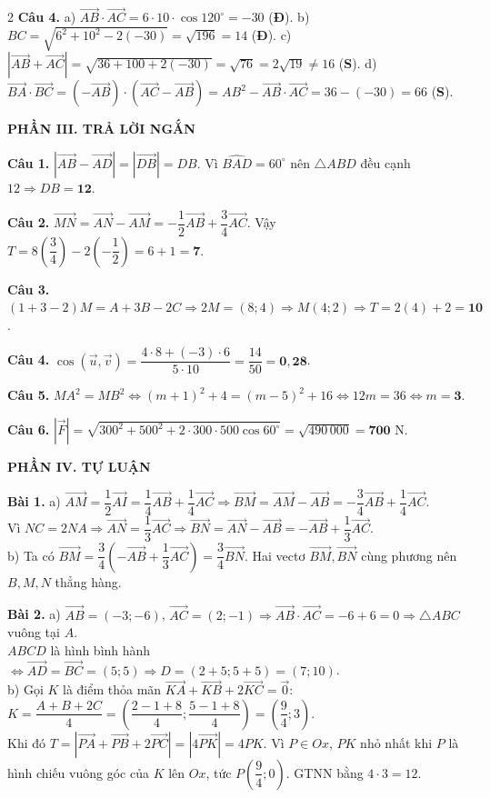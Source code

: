 \documentclass[10pt,a4paper]{article}
\begin{document}
\begin{multicols}{2}
\textbf{Câu 4.}
a) $\vec{AB}\cdot\vec{AC} = 6\cdot 10\cdot\cos 120^\circ = -30$ (\textbf{Đ}).
b) $BC = \sqrt{6^2 + 10^2 - 2(-30)} = \sqrt{196} = 14$ (\textbf{Đ}).
c) $|\vec{AB} + \vec{AC}| = \sqrt{36 + 100 + 2(-30)} = \sqrt{76} = 2\sqrt{19} \neq 16$ (\textbf{S}).
d) $\vec{BA}\cdot\vec{BC} = (-\vec{AB})\cdot(\vec{AC} - \vec{AB}) = AB^2 - \vec{AB}\cdot\vec{AC} = 36 - (-30) = 66$ (\textbf{S}).

\textbf{\color{brandDark}\textsf{PHẦN III. TRẢ LỜI NGẮN}}

\textbf{Câu 1.} $|\vec{AB} - \vec{AD}| = |\vec{DB}| = DB$. Vì $\widehat{BAD} = 60^\circ$ nên $\triangle ABD$ đều cạnh $12 \Rightarrow DB = \mathbf{12}$.

\textbf{Câu 2.} $\vec{MN} = \vec{AN} - \vec{AM} = -\dfrac{1}{2}\vec{AB} + \dfrac{3}{4}\vec{AC}$. Vậy $T = 8\left(\dfrac{3}{4}\right) - 2\left(-\dfrac{1}{2}\right) = 6 + 1 = \mathbf{7}$.

\textbf{Câu 3.} $(1 + 3 - 2)M = A + 3B - 2C \Rightarrow 2M = (8; 4) \Rightarrow M(4; 2) \Rightarrow T = 2(4) + 2 = \mathbf{10}$.

\textbf{Câu 4.} $\cos(\vec{u}, \vec{v}) = \dfrac{4\cdot 8 + (-3)\cdot 6}{5\cdot 10} = \dfrac{14}{50} = \mathbf{0{,}28}$.

\textbf{Câu 5.} $MA^2 = MB^2 \Leftrightarrow (m + 1)^2 + 4 = (m - 5)^2 + 16 \Leftrightarrow 12m = 36 \Leftrightarrow m = \mathbf{3}$.

\textbf{Câu 6.} $|\vec{F}| = \sqrt{300^2 + 500^2 + 2\cdot 300\cdot 500\cos 60^\circ} = \sqrt{490\,000} = \mathbf{700}\text{ N}$.

\textbf{\color{brandDark}\textsf{PHẦN IV. TỰ LUẬN}}

\textbf{Bài 1.}
a) $\vec{AM} = \dfrac{1}{2}\vec{AI} = \dfrac{1}{4}\vec{AB} + \dfrac{1}{4}\vec{AC} \Rightarrow \vec{BM} = \vec{AM} - \vec{AB} = -\dfrac{3}{4}\vec{AB} + \dfrac{1}{4}\vec{AC}$.\\
Vì $NC = 2NA \Rightarrow \vec{AN} = \dfrac{1}{3}\vec{AC} \Rightarrow \vec{BN} = \vec{AN} - \vec{AB} = -\vec{AB} + \dfrac{1}{3}\vec{AC}$.\\
b) Ta có $\vec{BM} = \dfrac{3}{4}\left(-\vec{AB} + \dfrac{1}{3}\vec{AC}\right) = \dfrac{3}{4}\vec{BN}$. Hai vectơ $\vec{BM}, \vec{BN}$ cùng phương nên $B, M, N$ thẳng hàng.

\textbf{Bài 2.}
a) $\vec{AB} = (-3; -6)$, $\vec{AC} = (2; -1) \Rightarrow \vec{AB}\cdot\vec{AC} = -6 + 6 = 0 \Rightarrow \triangle ABC$ vuông tại $A$.\\
$ABCD$ là hình bình hành $\Leftrightarrow \vec{AD} = \vec{BC} = (5; 5) \Rightarrow D = (2 + 5; 5 + 5) = (7; 10)$.\\
b) Gọi $K$ là điểm thỏa mãn $\vec{KA} + \vec{KB} + 2\vec{KC} = \vec{0}$:\\
$K = \dfrac{A + B + 2C}{4} = \left(\dfrac{2 - 1 + 8}{4}; \dfrac{5 - 1 + 8}{4}\right) = \left(\dfrac{9}{4}; 3\right)$.\\
Khi đó $T = |\vec{PA} + \vec{PB} + 2\vec{PC}| = |4\vec{PK}| = 4PK$. Vì $P \in Ox$, $PK$ nhỏ nhất khi $P$ là hình chiếu vuông góc của $K$ lên $Ox$, tức $P\!\left(\dfrac{9}{4}; 0\right)$. GTNN bằng $4 \cdot 3 = 12$.


\end{multicols}
\end{document}

